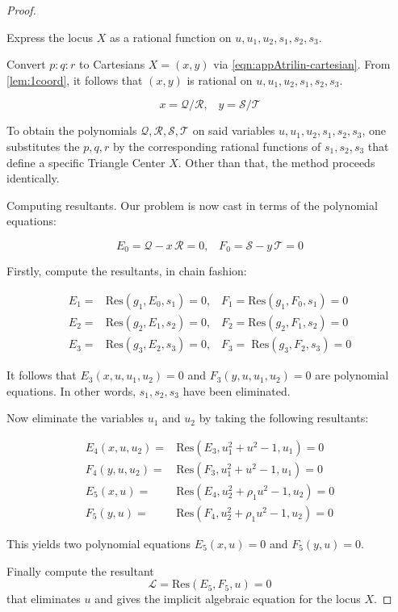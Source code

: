\begin{proof}
\begin{step} Express the locus  $X$ as a  rational function on  $u,u_1, u_2, s_1, s_2, s_3$.
\end{step}

Convert $p:q:r$ to Cartesians $ X = (x,y)$ via  \cref{eqn:appAtrilin-cartesian}. From  \cref{lem:1coord}, it follows that
$\left(x,y\right)$ is rational on $u,u_1,u_2,s_1,s_2,s_3$.

\begin{equation*} x=\mathcal{Q}/\mathcal{R},\;\;\;y=\mathcal{S}/\mathcal{T}
\end{equation*}

\noindent To obtain the polynomials    $\mathcal{Q,R,S,T}$  on said variables $u,u_1,u_2,s_1,s_2,s_3$,
 one substitutes the 
$p,q,r$ by the corresponding rational functions of  $s_1, s_2, s_3$ that define a specific Triangle Center $X$. Other than that, the method proceeds identically.

\begin{step}
Computing resultants.
Our problem is now cast in terms of the polynomial equations:

\begin{equation*}
E_0= \mathcal{Q}-x\,\mathcal{R}=0,\;\;\; F_0= \mathcal{S}-y\,\mathcal{T}=0
\end{equation*}

\end{step}

Firstly, compute the resultants, in chain fashion:  

\begin{align*}
    E_1=&\textrm{Res}(g_1,E_0,s_1)=0,\;\;\;F_1=\textrm{Res}(g_1,F_0,s_1)=0\\
	E_2=&\textrm{Res}(g_2,E_1,s_2)=0,\;\;\;F_2=\textrm{Res}(g_2,F_1,s_2)=0\\
	E_3=&\textrm{Res}(g_3,E_2,s_3)=0,\;\;\;F_3=\;\textrm{Res}(g_3,F_2,s_3)=0
\end{align*}
		 
It follows that  $E_3(x,u,u_1,u_2)=0$ and $F_3(y,u,u_1,u_2)=0$ are polynomial
equations. In other words, $s_1, s_2, s_3$ have been eliminated. 

Now  eliminate the variables $u_1$ and $u_2$ by taking the following resultants:

\begin{align*}
	E_4(x,u,u_2)=&\textrm{Res}(E_3,u_1^2+u^2-1,u_1)=0\\ 	F_4(y,u,u_2)=&\textrm{Res}(F_3,u_1^2+u^2-1,u_1)=0\\
	E_5(x,u)=&\textrm{Res}(E_4,u_2^2+\rho_1 u^2-1,u_2)=0\\
	F_5(y,u)=&\textrm{Res}(F_4,u_2^2+\rho_1 u^2-1,u_2)=0
\end{align*}

This yields two polynomial equations $E_5(x,u)=0$ and $F_5(y,u)=0$. 

Finally compute the resultant
$$ {\mathcal L} = \textrm{Res}(E_5,F_5,u)=0
$$
that eliminates $u$ and gives  the implicit algebraic equation for the locus $X$. 
\end{proof}

